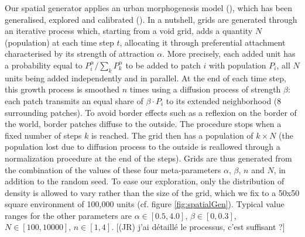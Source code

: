 \documentclass[Afour,sageh,times]{sagej}
\begin{document}
Our spatial generator applies an urban morphogenesis model (\cite{Batty2007}), which has been generalised, explored and calibrated (\cite{Raimbault2014}). In a nutshell, grids are generated through an iterative process which, starting from a void grid, adds a quantity $N$ (population) at each time step $t$, allocating it through preferential attachment  characterised by its strength of attraction $\alpha$. More precisely, each added unit has a probability equal to $P_i^{\alpha}/\sum_k P_k^{\alpha}$ to be added to patch $i$ with population $P_i$, all $N$ units being added independently and in parallel. At the end of each time step, this growth process is smoothed $n$ times using a diffusion process of strength $\beta$: each patch transmits an equal share of $\beta\cdot P_i$ to its extended neighborhood (8 surrounding patches). To avoid border effects such as a reflexion on the border of the world, border patches diffuse to the outside. The procedure stops when a fixed number of steps $k$ is reached. The grid then has a population of $k \times N$ (the population lost due to diffusion process to the outside is reallowed through a normalization procedure at the end of the steps). Grids are thus generated from the combination of the values of these four meta-parameters $\alpha$, $\beta$, $n$ and $N$, in addition to the random seed. To ease our exploration, only the distribution of density is allowed to vary rather than the size of the grid, which we fix to a 50x50 square environment of 100,000 units (cf. figure \ref{fig:spatialGen}). Typical value ranges for the other parameters are $\alpha\in\left[0.5,4.0\right]$, $\beta \in\left[0,0.3\right] $, $N\in \left[100,10000\right]$, $n\in\left[1,4\right]$.
[(JR) j'ai détaillé le processus, c'est suffisant ?] 
\end{document}
